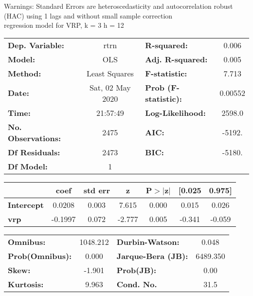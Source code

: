 Warnings: \newline
 [1] Standard Errors are heteroscedasticity and autocorrelation robust (HAC) using 1 lags and without small sample correction\\ 

regression model for VRP, k = 3 h = 12\begin{center}
\begin{tabular}{lclc}
\toprule
\textbf{Dep. Variable:}    &       rtrn       & \textbf{  R-squared:         } &     0.006   \\
\textbf{Model:}            &       OLS        & \textbf{  Adj. R-squared:    } &     0.005   \\
\textbf{Method:}           &  Least Squares   & \textbf{  F-statistic:       } &     7.713   \\
\textbf{Date:}             & Sat, 02 May 2020 & \textbf{  Prob (F-statistic):} &  0.00552    \\
\textbf{Time:}             &     21:57:49     & \textbf{  Log-Likelihood:    } &    2598.0   \\
\textbf{No. Observations:} &        2475      & \textbf{  AIC:               } &    -5192.   \\
\textbf{Df Residuals:}     &        2473      & \textbf{  BIC:               } &    -5180.   \\
\textbf{Df Model:}         &           1      & \textbf{                     } &             \\
\bottomrule
\end{tabular}
\begin{tabular}{lcccccc}
                   & \textbf{coef} & \textbf{std err} & \textbf{z} & \textbf{P$> |$z$|$} & \textbf{[0.025} & \textbf{0.975]}  \\
\midrule
\textbf{Intercept} &       0.0208  &        0.003     &     7.615  &         0.000        &        0.015    &        0.026     \\
\textbf{vrp}       &      -0.1997  &        0.072     &    -2.777  &         0.005        &       -0.341    &       -0.059     \\
\bottomrule
\end{tabular}
\begin{tabular}{lclc}
\textbf{Omnibus:}       & 1048.212 & \textbf{  Durbin-Watson:     } &    0.048  \\
\textbf{Prob(Omnibus):} &   0.000  & \textbf{  Jarque-Bera (JB):  } & 6489.350  \\
\textbf{Skew:}          &  -1.901  & \textbf{  Prob(JB):          } &     0.00  \\
\textbf{Kurtosis:}      &   9.963  & \textbf{  Cond. No.          } &     31.5  \\
\bottomrule
\end{tabular}
\end{center}

